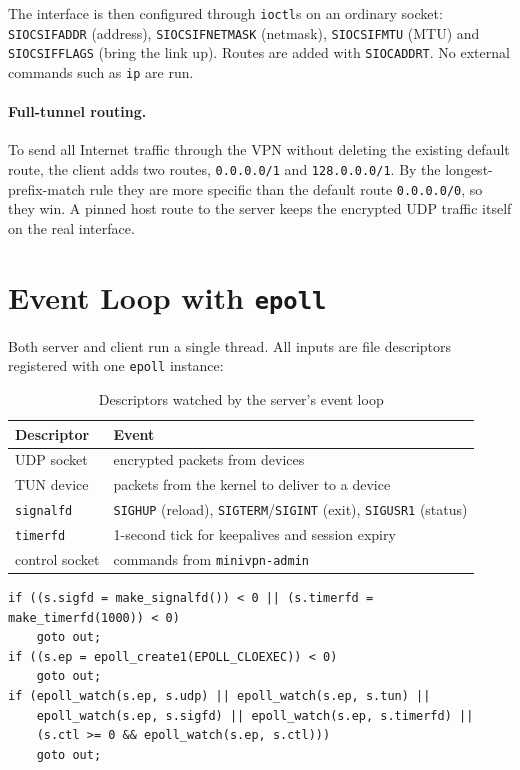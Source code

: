 \documentclass[12pt,a4paper]{report}
\begin{document}
The interface is then configured through \texttt{ioctl}s on an ordinary socket:
\texttt{SIOCSIFADDR} (address), \texttt{SIOCSIFNETMASK} (netmask), \texttt{SIOCSIFMTU}
(MTU) and \texttt{SIOCSIFFLAGS} (bring the link up). Routes are added with
\texttt{SIOCADDRT}. No external commands such as \texttt{ip} are run.

\paragraph{Full-tunnel routing.} To send all Internet traffic through the VPN without
deleting the existing default route, the client adds two routes, \texttt{0.0.0.0/1} and
\texttt{128.0.0.0/1}. By the longest-prefix-match rule they are more specific than the
default route \texttt{0.0.0.0/0}, so they win. A pinned host route to the server keeps
the encrypted UDP traffic itself on the real interface.

\section{Event Loop with \texttt{epoll}}
Both server and client run a single thread. All inputs are file descriptors registered
with one \texttt{epoll} instance:

\begin{table}[H]
\centering
\caption{Descriptors watched by the server's event loop}
\begin{tabular}{@{}ll@{}}
\toprule
\textbf{Descriptor} & \textbf{Event}\\
\midrule
UDP socket & encrypted packets from devices\\
TUN device & packets from the kernel to deliver to a device\\
\texttt{signalfd} & \texttt{SIGHUP} (reload), \texttt{SIGTERM}/\texttt{SIGINT} (exit), \texttt{SIGUSR1} (status)\\
\texttt{timerfd} & 1-second tick for keepalives and session expiry\\
control socket & commands from \texttt{minivpn-admin}\\
\bottomrule
\end{tabular}
\end{table}

\begin{lstlisting}[caption={Registering descriptors (\texttt{src/server.c})}]
if ((s.sigfd = make_signalfd()) < 0 || (s.timerfd = make_timerfd(1000)) < 0)
    goto out;
if ((s.ep = epoll_create1(EPOLL_CLOEXEC)) < 0)
    goto out;
if (epoll_watch(s.ep, s.udp) || epoll_watch(s.ep, s.tun) ||
    epoll_watch(s.ep, s.sigfd) || epoll_watch(s.ep, s.timerfd) ||
    (s.ctl >= 0 && epoll_watch(s.ep, s.ctl)))
    goto out;
\end{lstlisting}
\end{document}
